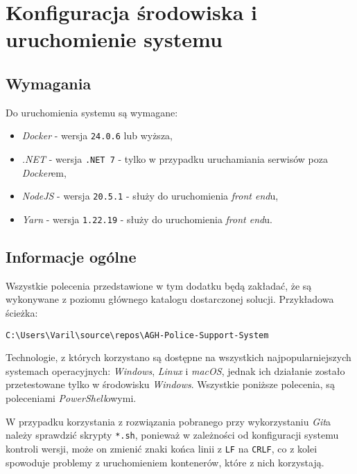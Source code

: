 \chapter{Konfiguracja środowiska i uruchomienie systemu}

\section{Wymagania}

\par Do uruchomienia systemu są wymagane:
\begin{itemize}
    \item \emph{Docker}\cite{DOCKER_SITE} - wersja \texttt{24.0.6} lub wyższa,
    \item \emph{.NET}\cite{DOTNET_SITE} - wersja \texttt{.NET 7} - tylko w przypadku uruchamiania serwisów poza \emph{Docker}em,
    \item \emph{NodeJS}\cite{NODEJS_SITE} - wersja \texttt{20.5.1} - służy do uruchomienia \emph{front end}u,
    \item \emph{Yarn}\cite{YARN_SITE} - wersja \texttt{1.22.19} - służy do uruchomienia \emph{front end}u.
\end{itemize}

\section{Informacje ogólne}

Wszystkie polecenia przedstawione w tym dodatku będą zakładać, że są wykonywane z poziomu głównego katalogu dostarczonej solucji. Przykładowa ścieżka:
\begin{verbatim}
C:\Users\Varil\source\repos\AGH-Police-Support-System
\end{verbatim}
Technologie, z których korzystano są dostępne na wszystkich najpopularniejszych systemach operacyjnych: \emph{Windows}, \emph{Linux} i \emph{macOS}, jednak ich działanie zostało przetestowane tylko w środowisku \emph{Windows}. Wszystkie poniższe polecenia, są poleceniami \emph{PowerShell}owymi.

\par W przypadku korzystania z rozwiązania pobranego przy wykorzystaniu \emph{Git}a\cite{GIT_SITE} należy sprawdzić skrypty \texttt{*.sh}, ponieważ w zależności od konfiguracji systemu kontroli wersji, może on zmienić znaki końca linii z \texttt{LF} na \texttt{CRLF}, co z kolei spowoduje problemy z uruchomieniem kontenerów, które z nich korzystają.


